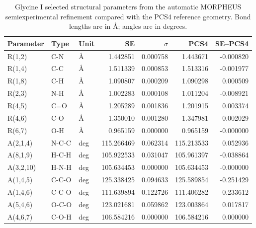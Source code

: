 \begin{table}
\caption{Glycine I selected structural parameters from the automatic MORPHEUS semiexperimental refinement compared with the PCS4 reference geometry. Bond lengths are in \AA; angles are in degrees.}
\label{tab:glycine-I-pcs4-geometry}
\begin{tabular}{lllrrrr}
\toprule
Parameter & Type & Unit & SE & $\sigma$ & PCS4 & SE--PCS4 \\
\midrule
R(1,2) & C-N & \AA & 1.442851 & 0.000758 & 1.443671 & -0.000820 \\
R(1,4) & C-C & \AA & 1.511339 & 0.000853 & 1.513316 & -0.001977 \\
R(1,8) & C-H & \AA & 1.090807 & 0.000209 & 1.090298 & 0.000509 \\
R(2,3) & N-H & \AA & 1.002283 & 0.000108 & 1.011204 & -0.008921 \\
R(4,5) & C=O & \AA & 1.205289 & 0.001836 & 1.201915 & 0.003374 \\
R(4,6) & C-O & \AA & 1.350010 & 0.001280 & 1.347981 & 0.002029 \\
R(6,7) & O-H & \AA & 0.965159 & 0.000000 & 0.965159 & -0.000000 \\
A(2,1,4) & N-C-C & deg & 115.266469 & 0.062314 & 115.213533 & 0.052936 \\
A(8,1,9) & H-C-H & deg & 105.922533 & 0.031047 & 105.961397 & -0.038864 \\
A(3,2,10) & H-N-H & deg & 105.634453 & 0.000000 & 105.634453 & -0.000000 \\
A(1,4,5) & C-C-O & deg & 125.338425 & 0.094633 & 125.589854 & -0.251429 \\
A(1,4,6) & C-C-O & deg & 111.639894 & 0.122726 & 111.406282 & 0.233612 \\
A(5,4,6) & O-C-O & deg & 123.021681 & 0.059862 & 123.003864 & 0.017817 \\
A(4,6,7) & C-O-H & deg & 106.584216 & 0.000000 & 106.584216 & 0.000000 \\
\bottomrule
\end{tabular}
\end{table}
